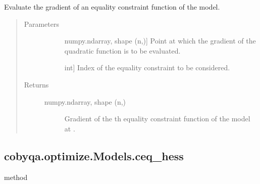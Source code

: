 \documentclass[letterpaper,10pt,english]{sphinxmanual}
\begin{document}
\begin{fulllineitems}
\begin{fulllineitems}
\label{\detokenize{refs/generated/cobyqa.optimize.Models.ceq_grad:cobyqa.optimize.Models.ceq_grad}}
\sphinxAtStartPar
Evaluate the gradient of an equality constraint function of the model.
\begin{quote}\begin{description}
\item[{Parameters}] \leavevmode\begin{description}
\item[{}] \leavevmode{[}numpy.ndarray, shape (n,){]}
\sphinxAtStartPar
Point at which the gradient of the quadratic function is to be
evaluated.

\item[{}] \leavevmode{[}int{]}
\sphinxAtStartPar
Index of the equality constraint to be considered.

\end{description}

\item[{Returns}] \leavevmode\begin{description}
\item[{numpy.ndarray, shape (n,)}] \leavevmode
\sphinxAtStartPar
Gradient of the \sphinxhyphen{}th equality constraint function of the model at
.

\end{description}

\end{description}\end{quote}

\end{fulllineitems}



\subsection{cobyqa.optimize.Models.ceq\_hess}
\label{\detokenize{refs/generated/cobyqa.optimize.Models.ceq_hess:cobyqa-optimize-models-ceq-hess}}\label{\detokenize{refs/generated/cobyqa.optimize.Models.ceq_hess::doc}}
\sphinxAtStartPar
method


\end{fulllineitems}
\end{document}
